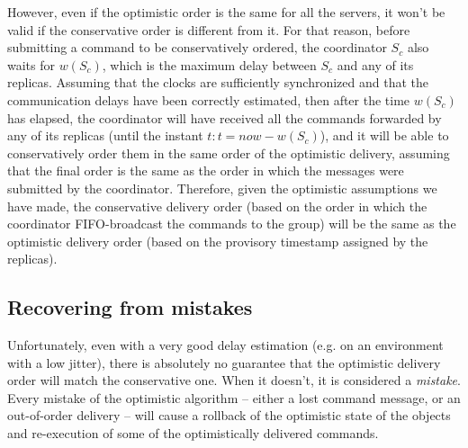 \documentclass[times, 10pt]{article}
\begin{document}
However, even if the optimistic order is the same for all the servers, it won't be valid if the conservative order is different from it. For that reason, before submitting a command to be conservatively ordered, the coordinator $S_c$ also waits for $w(S_c)$, which is the maximum delay between $S_c$ and any of its replicas. Assuming that the clocks are sufficiently synchronized and that the communication delays have been correctly estimated, then after the time $w(S_c)$ has elapsed, the coordinator will have received all the commands forwarded by any of its replicas (until the instant $t:t=now-w(S_c)$), and it will be able to conservatively order them in the same order of the optimistic delivery, assuming that the final order is the same as the order in which the messages were submitted by the coordinator. Therefore, given the optimistic assumptions we have made, the conservative delivery order (based on the order in which the coordinator FIFO-broadcast the commands to the group) will be the same as the optimistic delivery order (based on the provisory timestamp assigned by the replicas).

\subsection{Recovering from mistakes}

Unfortunately, even with a very good delay estimation (e.g. on an environment with a low jitter), there is absolutely no guarantee that the optimistic delivery order will match the conservative one. When it doesn't, it is considered a \emph{mistake}. Every mistake of the optimistic algorithm -- either a lost command message, or an out-of-order delivery -- will cause a rollback of the optimistic state of the objects and re-execution of some of the optimistically delivered commands.
\end{document}
